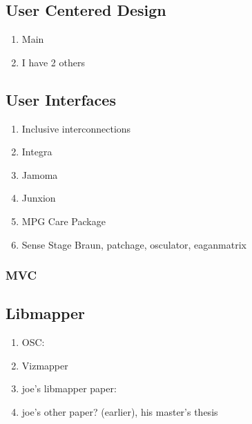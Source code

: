 \subsection{User Centered Design}
	\begin{enumerate}
		\item Main \cite{usd}
		\item I have 2 others
	\end{enumerate}

\subsection{User Interfaces}
	\begin{enumerate}
		\item Inclusive interconnections \cite{inclusiveinterconnections}
		\item Integra \cite{integra}
		\item Jamoma \cite{jamoma}
		\item Junxion \cite{junxion}
		\item MPG Care Package \cite{MPGcarepackage}
		\item Sense Stage \cite{senseStage}
		Braun, patchage, osculator, eaganmatrix
	\end{enumerate}
	\subsubsection{MVC}

\subsection{Libmapper}
	\begin{enumerate}
		\item OSC: \cite{osc}
		\item Vizmapper \cite{vizmapper}
		\item joe's libmapper paper: \cite{malloch}
		\item joe's other paper? (earlier), his master's thesis
	\end{enumerate}


